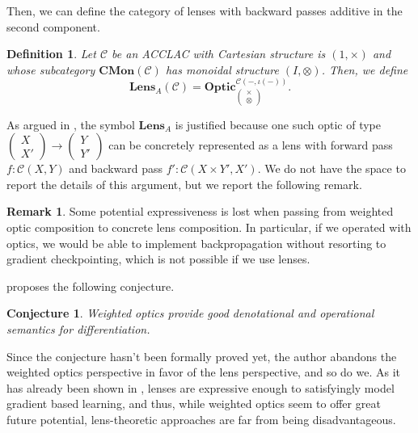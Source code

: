 \documentclass[12pt,a4paper,openright,twoside]{report}
\theoremstyle{plain}
\newtheorem{definition}[proposition]{Definition}
\newtheorem{conjecture}[proposition]{Conjecture}
\theoremstyle{definition}
\newtheorem{remark}[proposition]{Remark}
\begin{document}
Then, we can define the category of lenses with backward passes additive in the second component.

\begin{definition}
  Let $\mathcal{C}$ be an ACCLAC with Cartesian structure is $(1, \times)$ and whose subcategory $\mathbf{CMon}(\mathcal{C})$ has monoidal structure $(I, \otimes)$. Then, we define
  \[\mathbf{Lens}_A(\mathcal{C}) = \mathbf{Optic}_{\left(\begin{smallmatrix}\times \\ \otimes\end{smallmatrix}\right)}^{\mathcal{C}(-,\iota(-))}.\]
\end{definition}

As argued in \cite{gavranovic2024fundamental}, the symbol $\mathbf{Lens}_A$ is justified because one such optic of type $\left(\begin{smallmatrix}X \\ X'\end{smallmatrix}\right) \to \left(\begin{smallmatrix}Y \\ Y'\end{smallmatrix}\right)$ can be concretely represented as a lens with forward pass $f : \mathcal{C}(X,Y)$ and backward pass $f' : \mathcal{C}(X \times Y',X')$. We do not have the space to report the details of this argument, but we report the following remark.

\begin{remark}
  Some potential expressiveness is lost when passing from weighted optic composition to concrete lens composition. In particular, if we operated with optics, we would be able to implement backpropagation without resorting to gradient checkpointing, which is not possible if we use lenses. 
\end{remark}


\cite{gavranovic2024fundamental} proposes the following conjecture.

\begin{conjecture}
  Weighted optics provide good denotational and operational semantics for differentiation.
\end{conjecture}

Since the conjecture hasn't been formally proved yet, the author abandons the weighted optics perspective in favor of the lens perspective, and so do we. As it has already been shown in \cite{cruttwell2022categorical}, lenses are expressive enough to satisfyingly model gradient based learning, and thus, while weighted optics seem to offer great future potential, lens-theoretic approaches are far from being disadvantageous.
\end{document}

